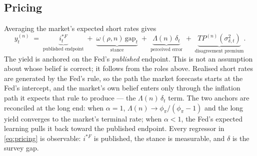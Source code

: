 \documentclass[11pt]{article}
\begin{document}
\subsection{Pricing}
Averaging the market's expected short rates gives
\begin{equation}
y^{(n)}_t \;=\; \underbrace{i^{*F}_t}_{\text{published endpoint}}
\;+\; \underbrace{\omega(\rho,n)\,\text{gap}_t}_{\text{stance}}
\;+\; \underbrace{\Lambda(n)\,\delta_t}_{\text{perceived error}}
\;+\; \underbrace{TP^{(n)}\!\left(\sigma^{2}_{\delta,t}\right)}_{\text{disagreement premium}} .
\label{eq:pricing}
\end{equation}
The yield is anchored on the Fed's \emph{published} endpoint. This is not an assumption about
whose belief is correct; it follows from the roles above. Realised short rates are generated by
the Fed's rule, so the path the market forecasts starts at the Fed's intercept, and the
market's own belief enters only through the inflation path it expects that rule to produce ---
the $\Lambda(n)\,\delta_t$ term. The two anchors are reconciled at the long end: when
$\alpha=1$, $\Lambda(n)\to\phi_\pi/(\phi_\pi-1)$ and the long yield converges to the market's
terminal rate; when $\alpha<1$, the Fed's expected learning pulls it back toward the published
endpoint. Every regressor in \eqref{eq:pricing} is observable: $i^{*F}$ is published, the
stance is measurable, and $\delta$ is the survey gap.
\end{document}
